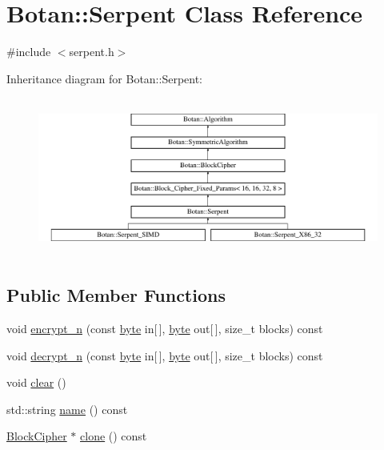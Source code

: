 \hypertarget{classBotan_1_1Serpent}{\section{Botan\-:\-:Serpent Class Reference}
\label{classBotan_1_1Serpent}
}


{\ttfamily \#include $<$serpent.\-h$>$}

Inheritance diagram for Botan\-:\-:Serpent\-:\begin{figure}[H]
\begin{center}
\leavevmode
\includegraphics[height=5.233645cm]{classBotan_1_1Serpent}
\end{center}
\end{figure}
\subsection*{Public Member Functions}
\begin{DoxyCompactItemize}
\item 
void \hyperlink{classBotan_1_1Serpent_a108c16f4dfc0925ded52eba795cd5153}{encrypt\-\_\-n} (const \hyperlink{namespaceBotan_a7d793989d801281df48c6b19616b8b84}{byte} in\mbox{[}$\,$\mbox{]}, \hyperlink{namespaceBotan_a7d793989d801281df48c6b19616b8b84}{byte} out\mbox{[}$\,$\mbox{]}, size\-\_\-t blocks) const 
\item 
void \hyperlink{classBotan_1_1Serpent_a3eb047c3299fb267312d8663107a843e}{decrypt\-\_\-n} (const \hyperlink{namespaceBotan_a7d793989d801281df48c6b19616b8b84}{byte} in\mbox{[}$\,$\mbox{]}, \hyperlink{namespaceBotan_a7d793989d801281df48c6b19616b8b84}{byte} out\mbox{[}$\,$\mbox{]}, size\-\_\-t blocks) const 
\item 
void \hyperlink{classBotan_1_1Serpent_a111d701c83bd18ddebf39a2091b71e28}{clear} ()
\item 
std\-::string \hyperlink{classBotan_1_1Serpent_a4dde28f8077264dbe78346321f387e81}{name} () const 
\item 
\hyperlink{classBotan_1_1BlockCipher}{Block\-Cipher} $\ast$ \hyperlink{classBotan_1_1Serpent_a37e5782d114c027f1db73898a8b96070}{clone} () const 
\end{DoxyCompactItemize}
